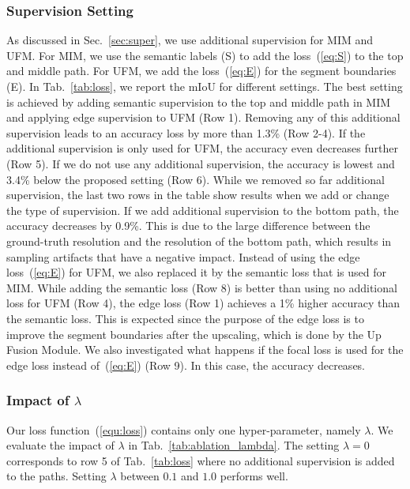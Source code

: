 \documentclass[letterpaper, 10 pt, journal, twoside]{ieeetran}
\newcommand{\tabref}[1]{Tab.~\ref{#1}}
\newcommand{\secref}[1]{Sec.~\ref{#1}}
\newcommand{\equref}[1]{~(\ref{#1})}
\begin{document}
\subsubsection{Supervision Setting}
As discussed in \secref{sec:super}, we use additional supervision for MIM and UFM. For MIM, we use the semantic labels (S) to add the loss\equref{eq:S} to the top and middle path. For UFM, we add the loss\equref{eq:E} for the segment boundaries (E). In \tabref{tab:loss}, we report the mIoU for different settings. The best setting is achieved by adding semantic supervision to the top and middle path in MIM and applying edge supervision to UFM (Row 1). Removing any of this additional supervision leads to an accuracy loss by more than 1.3\% (Row 2-4). If the additional supervision is only used for UFM, the accuracy even decreases further (Row 5). If we do not use any additional supervision, the accuracy is lowest and 3.4\% below the proposed setting (Row 6). While we removed so far additional supervision, the last two rows in the table show results when we add or change the type of supervision. If we add additional supervision to the bottom path, the accuracy decreases by 0.9\%. This is due to the large difference between the ground-truth resolution and the resolution of the bottom path, which results in sampling artifacts that have a negative impact.   
Instead of using the edge loss\equref{eq:E} for UFM, we also replaced it by the semantic loss that is used for MIM. While adding the semantic loss (Row 8) is better than using no additional loss for UFM (Row 4), the edge loss (Row 1) achieves a 1\% higher accuracy than the semantic loss.
This is expected
since the purpose of the edge loss is to improve the segment
boundaries after the upscaling, which is done by the Up
Fusion Module.
We also investigated what happens if the focal loss \cite{lin2017focal} is used for the edge loss instead of\equref{eq:E} (Row 9). In this case, the accuracy decreases.    













\subsubsection{Impact of $\lambda$}
Our loss function\equref{equ:loss} contains only one hyper-parameter, namely $\lambda$. We evaluate the impact of $\lambda$ in \tabref{tab:ablation_lambda}. The setting $\lambda=0$ corresponds to row 5 of \tabref{tab:loss} where no additional supervision is added to the paths. Setting $\lambda$ between $0.1$ and $1.0$ performs well. 
\end{document}
